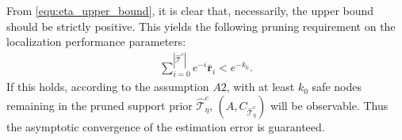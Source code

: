 \begin{remark}\label{rmk:performance_require}
From \eqref{equ:eta_upper_bound}, it is clear that, necessarily, the upper bound should be strictly positive. This yields the following pruning requirement on the localization performance parameters:
\begin{align}\label{equ:localization_performance_criterion}
\sum\limits_{i=0}^{|\hat{\mathcal{T}}^c|}e^{-i}\bar{\mathbf{r}}_i < e^{-k_0}.
\end{align}
If this holds, according to the assumption $A2$, with at least $k_0$ safe nodes remaining in the pruned support prior $\hat{\mathcal{T}}^c_{\eta}$, $(A,C_{\hat{\mathcal{T}}^c_{\eta}})$ will be observable. Thus the asymptotic convergence of the estimation error is guaranteed. 
\end{remark}


